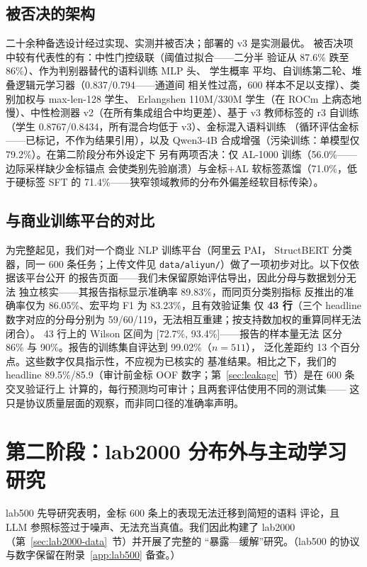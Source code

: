 \documentclass[11pt,a4paper]{article}
\newcommand{\code}[1]{\texttt{#1}}
\begin{document}
\subsection{被否决的架构}

二十余种备选设计经过实现、实测并被否决；部署的 v3 是实测最优。
被否决项中较有代表性的有：中性门控级联（阈值过拟合——二分半
验证从 87.6\% 跌至 86\%）、作为判别器替代的语料训练 MLP 头、
学生概率
平均、自训练第二轮、堆叠逻辑元学习器（0.837/0.794——通道间
相关性过高，600 样本不足以支撑）、类别加权与 max-len-128 学生、
Erlangshen 110M/330M 学生（在 ROCm 上病态地慢）、中性检测器
v2（在所有集成组合中均更差）、基于 v3 教师标签的 r3 自训练
（学生 0.8767/0.8434，所有混合均低于 v3）、金标混入语料训练
（循环评估金标——已标记，不作为结果引用），以及 Qwen3-4B
合成增强（污染训练：单模型仅 79.2\%）。在第二阶段分布外设定下
另有两项否决：仅 AL-1000 训练（56.0\%——边际采样缺少金标锚点
会使类别先验崩溃）与金标+AL 软标签蒸馏（71.0\%，低于硬标签
SFT 的 71.4\%——狭窄领域教师的分布外偏差经软目标传染）。

\subsection{与商业训练平台的对比}

为完整起见，我们对一个商业 NLP 训练平台（阿里云 PAI，
StructBERT 分类器，同一 600 条任务；上传文件见
\code{data/aliyun/}）做了一项初步对比。以下仅依据该平台公开
的报告页面——我们未保留原始评估导出，因此分母与数据划分无法
独立核实——其报告指标显示准确率 89.83\%，而同页分类别指标
反推出的准确率仅为 86.05\%、宏平均 F1 为 83.23\%，且有效验证集
仅 \textbf{43 行}（三个 headline 数字对应的分母分别为
59/60/119，无法相互重建；按支持数加权的重算同样无法闭合）。
43 行上的 Wilson 区间为 [72.7\%, 93.4\%]——报告的样本量无法
区分 86\% 与 90\%。报告的训练集自评达到 99.02\%（$n=511$），
泛化差距约 13 个百分点。这些数字仅具指示性，不应视为已核实的
基准结果。相比之下，我们的 headline 89.5\%/85.9（审计前金标
OOF 数字；第~\ref{sec:leakage}~节）是在 600 条交叉验证行上
计算的，每行预测均可审计；且两套评估使用不同的测试集——
这只是协议质量层面的观察，而非同口径的准确率声明。

\section{第二阶段：lab2000 分布外与主动学习研究}
\label{sec:lab2000}

lab500 先导研究表明，金标 600 条上的表现无法迁移到简短的语料
评论，且 LLM 参照标签过于噪声、无法充当真值。我们因此构建了
lab2000（第~\ref{sec:lab2000-data}~节）并开展了完整的
“暴露—缓解”研究。（lab500 的协议与数字保留在附录~\ref{app:lab500}
备查。）
\end{document}
